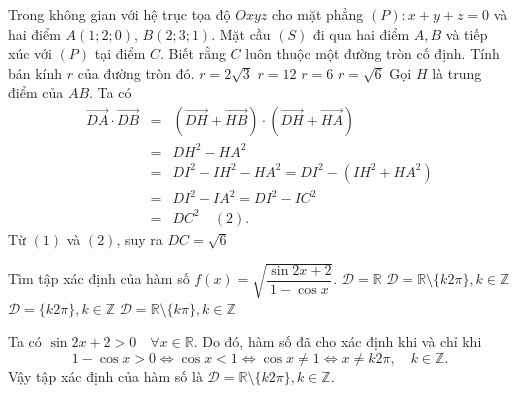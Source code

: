 \begin{ex}%
	Trong không gian với hệ trục tọa độ $Oxyz$ cho mặt phẳng $(P) \colon x+y+z=0 $ và hai điểm $A(1;2;0)$, $B(2;3;1)$. Mặt cầu $(S)$ đi qua hai điểm  $A, B$ và tiếp xúc với  $(P)$ tại điểm $C$. Biết rằng $C$ luôn thuộc một đường tròn cố định. Tính bán kính $r$ của đường tròn đó.
		\choice
	{$r=2\sqrt{3}$}
	{$r=12$}
	{$r=6$}
	{\True $r=\sqrt{6}$}
	\loigiai
	{
	\noindent	Gọi $H$ là trung điểm của $AB$. Ta có 
		\begin{eqnarray*}
			\vec{DA}\cdot \vec{DB}&=&\left( \vec{DH}+\vec{HB}\right)\cdot \left( \vec{DH}+\vec{HA}\right) \\
			&=& DH^2- HA^2\\
			&=& DI^2-IH^2-HA^2= DI^2-\left( IH^2+HA^2\right)\\
			&= &DI^2-IA^2=DI^2-IC^2\\
			&=&DC^2\quad (2).
		\end{eqnarray*}
	Từ $(1)$ và $(2)$, suy ra $DC=\sqrt{6}$
	}
\end{ex}

\begin{ex}%
	Tìm tập xác định của hàm số $f(x)=\sqrt{\dfrac{\sin 2x+2}{1-\cos x}}$.
		\choice
	{$\mathscr{D} =\mathbb{R}$}
	{\True $\mathscr {D}= \mathbb{R}\setminus \{k2\pi \}, k \in \mathbb{Z}$}
	{$\mathscr {D}=\{k2\pi\}, k \in \mathbb{Z}$}
	{$\mathscr {D}=\mathbb{R}\setminus \{k\pi \}, k \in \mathbb{Z}$}
	\loigiai
	{ Ta có $\sin2x+2>0 \quad \forall x\in \mathbb{R}$. Do đó, hàm số đã cho xác định khi và chỉ khi $$1-\cos x >0 \Leftrightarrow \cos x<1 \Leftrightarrow \cos x\neq 1 \Leftrightarrow x \neq k2\pi,\quad k\in \mathbb{Z}.$$
		Vậy tập xác định của hàm số là $\mathscr {D}= \mathbb{R}\setminus \{k2\pi \}, k \in \mathbb{Z}$.
		
	}
\end{ex}

